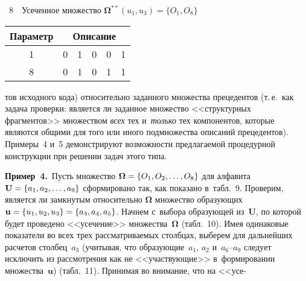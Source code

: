 \begin{multicols}{2}
\vspace*{3pt}


\noindent
{\small
 \begin{center}  %
 \parbox{46mm}{{\tablename~8}\ \ \small{Усеченное множество ${\boldsymbol{\Omega}}^{**}(u_1,u_3) = \{O_1, O_8\}$}}

\vspace*{2ex}

      \begin{tabular}{|c|c|c|c|c|c|}
\hline
Параметр& \multicolumn{5}{c|}{Описание}\\
\hline
1&0 & 1&\cellcolor[gray]{.6}0&0&1\\
8&0&1&\cellcolor[gray]{.6}0&1&1\\
\hline
\end{tabular}
\end{center}
}

\vspace*{3pt}



\noindent
тов исходного кода) относительно заданного множества 
прецедентов (т.\,е.\ как задача проверки:\linebreak
 является ли заданное множество 
<<структурных фрагментов>> множеством \textit{всех} тех и~\textit{только} тех 
компонентов, которые являются общими для того или иного подмножества 
описаний прецедентов). Примеры~4 и~5 демонстрируют возможности 
пред\-ла\-га\-емой процедурной конструкции при решении задач этого типа.
    
    \smallskip
    
    \noindent
    \textbf{Пример~4.}\ Пусть множество ${\boldsymbol{\Omega}}\hm = \{O_1, O_2, \ldots, 
O_8\}$ для алфавита $\mathbf{U}\hm = \{a_1, a_2, \ldots, a_9\}$ 
сформировано так, как показано в~табл.~9.
Проверим, является
 ли замкнутым относительно ${\boldsymbol{\Omega}}$ множество 
образующих $\mathbf{u}\hm= \{u_1, u_2, u_3\}\hm = \{a_3, a_4, a_5\}$. 
Начнем с~выбора образующей из~$\mathbf{U}$, по которой будет 
проведено <<усечение>> множества~${\boldsymbol{\Omega}}$ (табл.~10). Имея одинаковые 
показатели во всех трех рас\-смат\-ри\-ва\-емых столбцах, выберем для 
дальнейших расчетов столбец~$a_3$ (учитывая, что образующие~$a_1$, $a_2$ 
и~$a_6$--$a_9$ следует исключить из рас\-смот\-ре\-ния как не <<участвующие>> 
в~формировании множества~$\mathbf{u}$) (табл.~11). Принимая во 
внимание, что на <<усе-\linebreak\vspace*{-12pt}

\pagebreak


\end{multicols}
